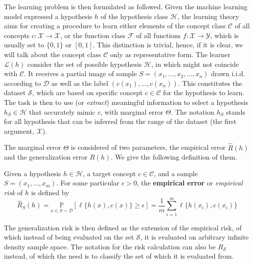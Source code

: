 \documentclass[
  journal=largetwo,
  year=2025,
  volume=37,
]{cup-journal}
\begin{document}
The learning problem is then formulated as followed. Given the machine learning model expressed a hypothesis $h$ of the hypothesis class $\mathcal{H}$, the learning theory aims for creating a procedure to learn either elements of the concept class $\mathcal{C}$ of all concepts $c: \mathcal{X}\to \mathcal{X}$, or the function class $\mathcal{F}$ of all functions $f: \mathcal{X}\to \mathcal{Y}$, which is usually set to $\{0,1\}$ or $[0,1]$. This distinction is trivial, hence, if it is clear, we will talk about the concept class $\mathcal{C}$ only as representative form. The learner $\mathcal{L}(h)$ consider the set of possible hypothesis $\mathcal{H}$, in which might not coincide with $\mathcal{C}$. It receives a partial image of sample $S=(x_{1},\dots,x_{2},\dots,x_n)$ drawn i.i.d. according to $\mathcal{D}$ as well as the label $(c(x_1),\dots,c(x_n))$. This constitutes the dataset $\mathcal{S}$, which are based on specific concept $c\in \mathcal{C}$ for the hypothesis to learn. The task is then to use (or \textit{extract}) meaningful information to select a hypothesis $h_{S}\in \mathcal{H}$ that accurately mimic $c$, with marginal error $\Theta$. The notation $h_{S}$ stands for all hypothesis that can be inferred from the range of the dataset (the first argument, $\mathcal{X}$). 

The marginal error $\Theta$ is considered of two parameters, the empirical error $\hat{R}(h)$ and the generalization error $R(h)$. We give the following definition of them. 

\begin{definition}
    Given a hypothesis $h\in \mathcal{H}$, a target concept $c\in \mathcal{C}$, and a sample $S=(x_{1},\dots,x_{m})$. For some particular $\epsilon>0$, the \textbf{empirical error} or \textit{empirical risk} of $h$ is defined by\begin{equation}
        \hat{R}_{S}(h) = \underset{x\in S\sim\mathcal{D}}{\mathbb{P}} [\ell\{h(x),c(x)\}\geq \epsilon] =\frac{1}{m} \sum_{i=1}^{m} \ell\{h(x_i),c(x_i)\}
    \end{equation}
\end{definition}

The generalization risk is then defined as the extension of the empirical risk, of which instead of being evaluated on the set $\mathcal{S}$, it is evaluated on arbitrary infinite density sample space. The notation for the risk calculation can also be $R_{\mathcal{S}}$ instead, of which the need is to classify the set of which it is evaluated from. 
\end{document}
